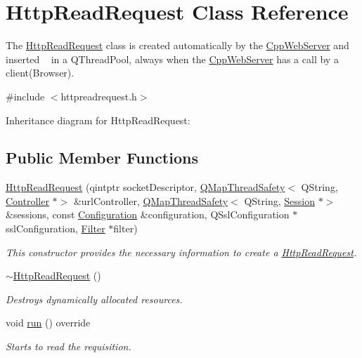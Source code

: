\hypertarget{class_http_read_request}{}\section{Http\+Read\+Request Class Reference}
\label{class_http_read_request}


The \hyperlink{class_http_read_request}{Http\+Read\+Request} class is created automatically by the \hyperlink{class_cpp_web_server}{Cpp\+Web\+Server} and inserted ~\newline
 in a Q\+Thread\+Pool, always when the \hyperlink{class_cpp_web_server}{Cpp\+Web\+Server} has a call by a client(\+Browser).  




{\ttfamily \#include $<$httpreadrequest.\+h$>$}



Inheritance diagram for Http\+Read\+Request\+:
\subsection*{Public Member Functions}
\begin{DoxyCompactItemize}
\item 
\hyperlink{class_http_read_request_a5522be561914b951ebaf580feb2c749a}{Http\+Read\+Request} (qintptr socket\+Descriptor, \hyperlink{class_q_map_thread_safety}{Q\+Map\+Thread\+Safety}$<$ Q\+String, \hyperlink{class_controller}{Controller} $\ast$$>$ \&url\+Controller, \hyperlink{class_q_map_thread_safety}{Q\+Map\+Thread\+Safety}$<$ Q\+String, \hyperlink{class_session}{Session} $\ast$$>$ \&sessions, const \hyperlink{class_configuration}{Configuration} \&configuration, Q\+Ssl\+Configuration $\ast$ssl\+Configuration, \hyperlink{class_filter}{Filter} $\ast$filter)
\begin{DoxyCompactList}\small\item\em This constructor provides the necessary information to create a \hyperlink{class_http_read_request}{Http\+Read\+Request}. \end{DoxyCompactList}\item 
\mbox{\label{class_http_read_request_a876bcf62d5428d982c5af6f35e59b963}} 
\hyperlink{class_http_read_request_a876bcf62d5428d982c5af6f35e59b963}{$\sim$\+Http\+Read\+Request} ()
\begin{DoxyCompactList}\small\item\em Destroys dynamically allocated resources. \end{DoxyCompactList}\item 
\mbox{\label{class_http_read_request_a8db91de80ce8e83a3b89758a22eec5c3}} 
void \hyperlink{class_http_read_request_a8db91de80ce8e83a3b89758a22eec5c3}{run} () override
\begin{DoxyCompactList}\small\item\em Starts to read the requisition. \end{DoxyCompactList}\end{DoxyCompactItemize}


